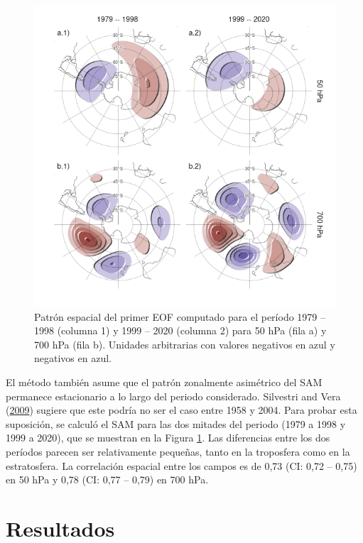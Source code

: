 \documentclass[12pt,oneside,a4paper]{reedthesis}
\begin{document}
\begin{figure}

{\centering \includegraphics{figures/30-sam/sam-period-1} 

}

\caption{Patrón espacial del primer EOF computado para el período 1979 -- 1998 (columna 1) y 1999 -- 2020 (columna 2) para 50 hPa (fila a) y 700 hPa (fila b). Unidades arbitrarias con valores negativos en azul y negativos en azul.}\label{fig:sam-period}
\end{figure}

El método también asume que el patrón zonalmente asimétrico del SAM permanece estacionario a lo largo del periodo considerado.
Silvestri and Vera (\protect\hyperlink{ref-silvestri2009}{2009}) sugiere que este podría no ser el caso entre 1958 y 2004.
Para probar esta suposición, se calculó el SAM para las dos mitades del periodo (1979 a 1998 y 1999 a 2020), que se muestran en la Figura \ref{fig:sam-period}.
Las diferencias entre los dos períodos parecen ser relativamente pequeñas, tanto en la troposfera como en la estratosfera.
La correlación espacial entre los campos es de 0,73 (CI: 0,72 -- 0,75) en 50 hPa y 0,78 (CI: 0,77 -- 0,79) en 700 hPa.

\hypertarget{resultados-2}{%
\section{Resultados}\label{resultados-2}}
\end{document}
